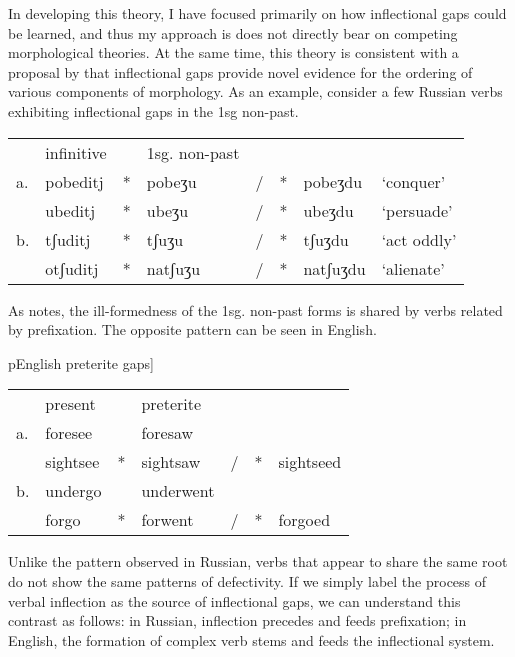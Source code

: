 In developing this theory, I have focused primarily on how inflectional gaps could be learned, and thus my approach is does not directly bear on competing morphological theories. At the same time, this theory is consistent with a proposal by \citet{Pesetsky1977} that inflectional gaps provide novel evidence for the ordering of various components of morphology. As an example, consider a few Russian verbs exhibiting inflectional gaps in the 1sg non-past. 

\begin{example}
\begin{tabular}{l l l@{}l@{}l@{}l@{}l@{} l}
   & infinitive &   & 1sg. non-past \\
a. & pobedit{j} & * & pobeʒu  & / & * & pobeʒdu  & `conquer'   \\
   & ubedit{j}  & * & ubeʒu   & / & * & ubeʒdu   & `persuade'  \\
b. & tʃudit{j}  & * & tʃuʒu   & / & * & tʃuʒdu & `act oddly'   \\
   & otʃudit{j} & * & natʃuʒu & / & * & natʃuʒdu & `alienate'  \\
\end{tabular}
\end{example}

\noindent As \citeauthor{Pesetsky1977} notes, the ill-formedness of the 1sg. non-past forms is shared by verbs related by prefixation. The opposite pattern can be seen in English. 

\begin{example}pEnglish preterite gaps]
\begin{tabular}{l l l@{}l@{}l@{}l@{}l@{}}
   & present  &   & preterite &   &   &           \\
a. & foresee  &   & foresaw   &   &   &           \\
   & sightsee & * & sightsaw  & / & * & sightseed \\
b. & undergo  &   & underwent &   &   &           \\
   & forgo    & * & forwent   & / & * & forgoed   \\
\end{tabular}
\end{example}

Unlike the pattern observed in Russian, verbs that appear to share the same root do not show the same patterns of defectivity. If we simply label the process of verbal inflection as the source of inflectional gaps, we can understand this contrast as follows: in Russian, inflection precedes and feeds prefixation; in English, the formation of complex verb stems and feeds the inflectional system. 

